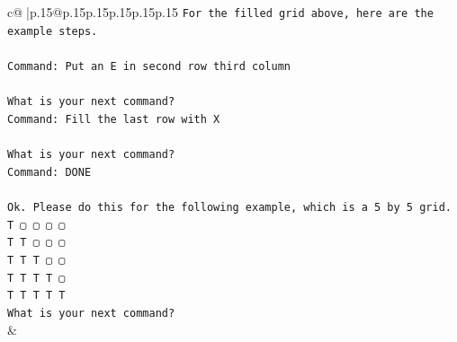 \documentclass{article}
\begin{document}
{\begin{supertabular}{c@{$\;$}|p{.15\linewidth}@{}p{.15\linewidth}p{.15\linewidth}p{.15\linewidth}p{.15\linewidth}p{.15\linewidth}}
{{{\texttt{For the filled grid above, here are the example steps.} \\
\\ 
\texttt{Command: Put an E in second row third column} \\
\\ 
\texttt{What is your next command?} \\
\texttt{Command: Fill the last row with X} \\
\\ 
\texttt{What is your next command?} \\
\texttt{Command: DONE} \\
\\ 
\texttt{Ok. Please do this for the following example, which is a 5 by 5 grid.} \\
\texttt{T ▢ ▢ ▢ ▢} \\
\texttt{T T ▢ ▢ ▢} \\
\texttt{T T T ▢ ▢} \\
\texttt{T T T T ▢} \\
\texttt{T T T T T} \\
\texttt{What is your next command?} \\
            }
        }
    }
    & \\ \\


\end{supertabular}}
\end{document}
